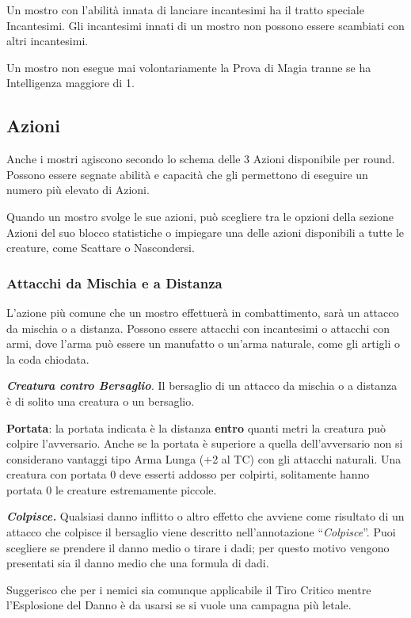 \begin{multicols}{2}
Un mostro con l'abilità innata di lanciare incantesimi ha il tratto speciale Incantesimi.
Gli incantesimi innati di un mostro non possono essere scambiati con altri incantesimi.

Un mostro non esegue mai volontariamente la Prova di Magia tranne se ha Intelligenza maggiore di 1.


\subsection{Azioni}

Anche i mostri agiscono secondo lo schema delle 3 Azioni disponibile per round. Possono essere segnate abilità e capacità che gli permettono di eseguire un numero più elevato di Azioni.

Quando un mostro svolge le sue azioni, può scegliere tra le opzioni della sezione Azioni del suo blocco statistiche o impiegare una delle azioni disponibili a tutte le creature, come Scattare o Nascondersi.

\subsubsection{Attacchi da Mischia e a Distanza}

L'azione più comune che un mostro effettuerà in combattimento, sarà un attacco da mischia o a distanza. Possono essere attacchi con incantesimi o attacchi con armi, dove l'arma può essere un manufatto o un'arma naturale, come gli artigli o la coda chiodata.

\textit{\textbf{Creatura contro Bersaglio}.} Il bersaglio di un attacco da mischia o a distanza è di solito una creatura o un bersaglio.

\textbf{Portata}: la portata indicata è la distanza \textbf{entro} quanti metri la creatura può colpire l'avversario. Anche se la portata è superiore a quella dell'avversario non si considerano vantaggi tipo Arma Lunga (+2 al TC) con gli attacchi naturali. Una creatura con portata 0 deve esserti addosso per colpirti, solitamente hanno portata 0 le creature estremamente piccole.

\textit{\textbf{Colpisce.}} Qualsiasi danno inflitto o altro effetto che avviene come risultato di un attacco che colpisce il bersaglio viene descritto nell'annotazione ``\textit{Colpisce}''. Puoi scegliere se prendere il danno medio o tirare i dadi; per questo motivo vengono presentati sia il danno medio che una formula di dadi.

Suggerisco che per i nemici sia comunque applicabile il Tiro Critico mentre l'Esplosione del Danno è da usarsi se si vuole una campagna più letale.


\end{multicols}
